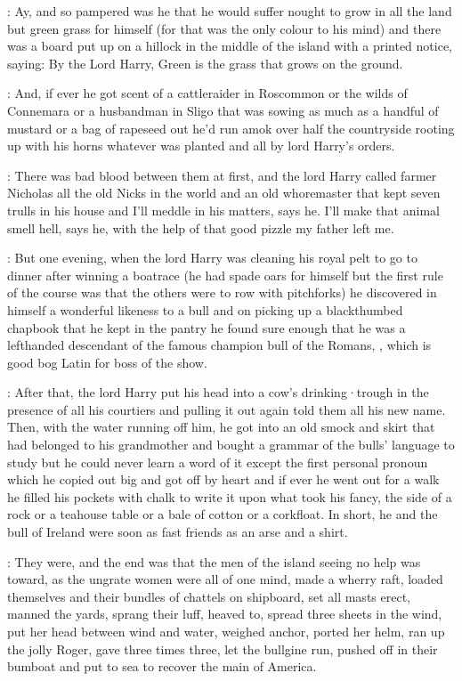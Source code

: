 \lenehan:
Ay,
and so pampered was he
that he would suffer nought to grow in all the land
but green grass for himself
(for that was the only colour to his mind)
and there was a board put up on a hillock in the middle of the
island with a printed notice,
saying:
By the Lord Harry,
Green is the
grass that grows on the ground.

\dixon:
And,
if ever he got scent of a cattleraider in Roscommon or the wilds
of Connemara or a husbandman in Sligo that was sowing as much as a handful
of mustard or a bag of rapeseed out he'd run amok over half the
countryside rooting up with his horns whatever was planted and all by lord
Harry's orders.

\lynch:
There was bad blood between them at first,
and the lord Harry called farmer Nicholas all the old Nicks in the world
and an old whoremaster that kept seven trulls in his house and
I'll meddle in his matters,
says he.
I'll make that animal smell hell,
says he,
with the help of that good pizzle my father left me.

\dixon:
But one evening,
when the lord Harry was cleaning his royal pelt to
go to dinner after winning a boatrace
(he had spade oars for himself but
the first rule of the course was that the others were to row with pitchforks)
he discovered in himself a wonderful likeness to a bull and on
picking up a blackthumbed chapbook that he kept in the pantry he found
sure enough that he was a lefthanded descendant of the famous champion
bull of the Romans,
,
which is good bog Latin for boss of
the show.

\lynch:
After that,
the lord Harry put his head into a cow's drinking·trough
in the presence of all his courtiers and pulling it out again told them
all his new name.
Then,
with the water running off him,
he got into an old
smock and skirt that had belonged to his grandmother and bought a grammar
of the bulls' language to study but he could never learn a word of it
except the first personal pronoun which he copied out big and got off by
heart and if ever he went out for a walk he filled his pockets with chalk
to write it upon what took his fancy,
the side of a rock or a teahouse
table or a bale of cotton or a corkfloat.
In short,
he and the bull of
Ireland were soon as fast friends as an arse and a shirt.

\stephen:
They were,
and the end was that the men of the island seeing no help
was toward,
as the ungrate women were all of one mind,
made a wherry raft,
loaded themselves and their bundles of chattels on shipboard,
set all
masts erect,
manned the yards,
sprang their luff,
heaved to,
spread three
sheets in the wind,
put her head between wind and water,
weighed anchor,
ported her helm,
ran up the jolly Roger,
gave three times three,
let the
bullgine run,
pushed off in their bumboat and put to sea to recover the
main of America.

